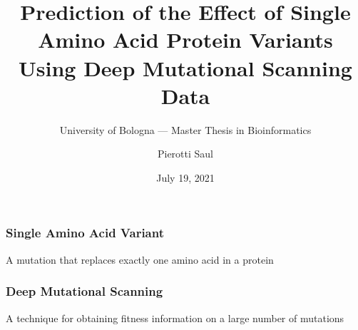 \documentclass[10pt, british, luatex]{beamer}
\title[Single Amino Acid Variants Prediction]{Prediction of the Effect of Single Amino Acid Protein
	Variants\\Using Deep Mutational Scanning Data}
\subtitle[]{University of Bologna --- Master Thesis in Bioinformatics}
\author[Pierotti Saul]{Pierotti Saul}
\date{July 19, 2021}
\begin{document}
\begin{frame}
	\titlepage%
\end{frame}

\begin{frame}
	\frametitle{Single Amino Acid Variant}
	A mutation that replaces exactly one amino acid in a protein
	\vfill%
	\begin{figure}
		
	\end{figure}
\end{frame}

\begin{frame}
	\frametitle{Deep Mutational Scanning}
	A technique for obtaining fitness information on a large number of mutations
	\vfill%
	\begin{figure}
		
	\end{figure}
\end{frame}
\end{document}
